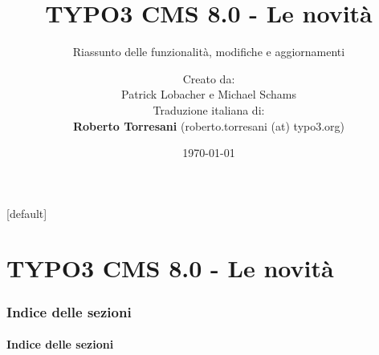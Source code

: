 \documentclass[t]{beamer}
\title{TYPO3 CMS 8.0 - Le novità}
\subtitle{Riassunto delle funzionalità, modifiche e aggiornamenti}
\author{
	\centerline{Creato da:}
	\centerline{Patrick Lobacher e Michael Schams}
	\vspace{0.4cm}
	\centerline{Traduzione italiana di:}
	\textbf{Roberto Torresani} (roberto.torresani (at) typo3.org)
}
\date{\today}
\begin{document}
\sharefont


\begingroup
	[default]
	\begin{frame}
		\titlepage
	\end{frame}
\endgroup


\section*{TYPO3 CMS 8.0 - Le novità}
\begin{frame}[fragile]
	\frametitle{Indice delle sezioni}
	\framesubtitle{Indice delle sezioni}

	\tableofcontents

\end{frame}










\end{document}
